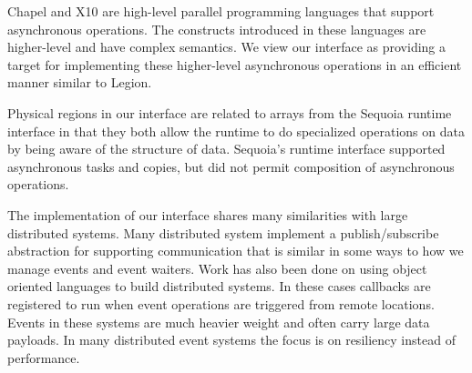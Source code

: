 Chapel\cite{Chamberlain:Chapel} and X10\cite{X1005} are high-level parallel
programming languages that support asynchronous operations.  The constructs
introduced in these languages are higher-level and have complex 
semantics.  We view our interface as providing a target
for implementing these higher-level asynchronous operations in an efficient
manner similar to Legion\cite{Legion12}.

Physical regions in our interface are related to
arrays from the Sequoia runtime interface\cite{Houston08} in that they
both allow the runtime to do specialized operations on data by being
aware of the structure of data.  Sequoia's runtime interface supported
asynchronous tasks and copies, but did not permit composition of
asynchronous operations.

The implementation of our interface shares many similarities with large
distributed systems.  Many distributed system implement a publish/subscribe
abstraction for supporting communication that is similar in some ways to how
we manage events and event waiters\cite{Aguilera99,Carzaniga01}.  Work has
also been done on using object oriented languages to build 
distributed systems\cite{Eugster01,Harrison97,Chang91}.  In these cases
callbacks are registered to run when event operations are triggered
from remote locations.  Events in these systems are much heavier weight
and often carry large data payloads.  In many distributed event systems
the focus is on resiliency instead of performance\cite{Ostrowski09}.
